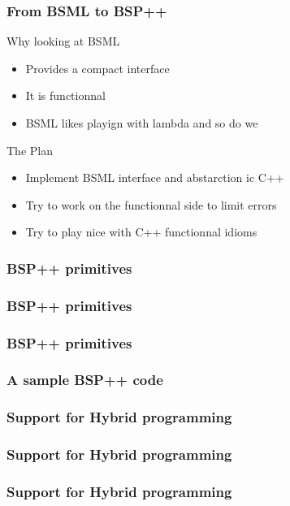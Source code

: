 \frame
{
  \frametitle{From BSML to BSP++}
  \begin{block}{Why looking at BSML}  
  \begin{itemize}
  \footnotesize
   \item Provides a compact interface
   \item It is functionnal
   \item BSML likes playign with lambda and so do we
  \end{itemize}
  \end{block}{}

  \begin{block}{The Plan}  
  \begin{itemize}
  \footnotesize
   \item Implement BSML interface and abstarction ic C++
   \item Try to work on the functionnal side to limit errors
   \item Try to play nice with C++ functionnal idioms
  \end{itemize}
  \end{block}{}
}


\frame
{
  \frametitle{BSP++ primitives}
}

\frame
{
  \frametitle{BSP++ primitives}
}

\frame
{
  \frametitle{BSP++ primitives}
}

\frame
{
  \frametitle{A sample BSP++ code}
}

\frame
{
  \frametitle{Support for Hybrid programming}

}

\frame
{
  \frametitle{Support for Hybrid programming}
  \begin{center}
  \end{center}
}

\frame
{
  \frametitle{Support for Hybrid programming}
}



